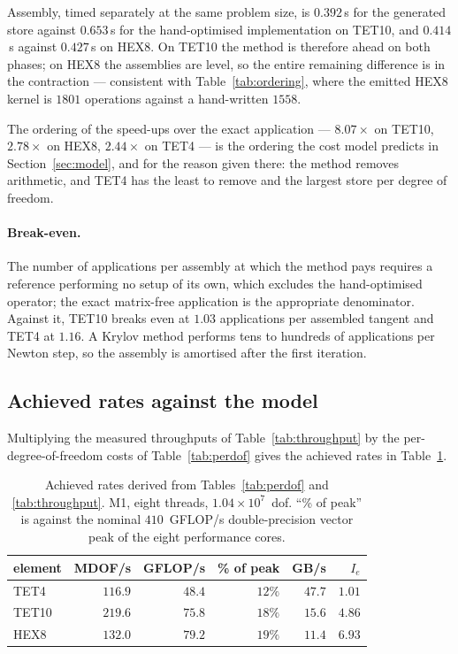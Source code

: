 \documentclass[11pt]{article}
\begin{document}
Assembly, timed separately at the same problem size, is $0.392$\,s for the
generated store against $0.653$\,s for the hand-optimised implementation on
TET10, and $0.414$\,s against $0.427$\,s on HEX8.  On TET10 the method is
therefore ahead on both phases; on HEX8 the assemblies are level, so the entire
remaining difference is in the contraction --- consistent with
Table~\ref{tab:ordering}, where the emitted HEX8 kernel is $1801$ operations
against a hand-written $1558$.

The ordering of the speed-ups over the exact application --- $8.07\times$ on
TET10, $2.78\times$ on HEX8, $2.44\times$ on TET4 --- is the ordering the cost
model predicts in Section~\ref{sec:model}, and for the reason given there: the
method removes arithmetic, and TET4 has the least to remove and the largest
store per degree of freedom.

\paragraph{Break-even.}  The number of applications per assembly at which the
method pays requires a reference performing no setup of its own, which excludes
the hand-optimised operator; the exact matrix-free application is the
appropriate denominator.  Against it, TET10 breaks even at $1.03$ applications
per assembled tangent and TET4 at $1.16$.  A Krylov method performs tens to
hundreds of applications per Newton step, so the assembly is amortised after the
first iteration.

\subsection{Achieved rates against the model}

Multiplying the measured throughputs of Table~\ref{tab:throughput} by the
per-degree-of-freedom costs of Table~\ref{tab:perdof} gives the achieved rates
in Table~\ref{tab:achieved}.

\begin{table}[ht]
\centering
\begin{tabular}{lrrrrr}
\toprule
element & MDOF/s & GFLOP/s & \% of peak & GB/s & $I_e$ \\
\midrule
TET4  & $116.9$ & $48.4$ & $12\%$ & $47.7$ & $1.01$ \\
TET10 & $219.6$ & $75.8$ & $18\%$ & $15.6$ & $4.86$ \\
HEX8  & $132.0$ & $79.2$ & $19\%$ & $11.4$ & $6.93$ \\
\bottomrule
\end{tabular}
\caption{Achieved rates derived from Tables~\ref{tab:perdof} and
\ref{tab:throughput}.  M1, eight threads, $1.04\times10^{7}$~dof.  ``\% of
peak'' is against the nominal $410$~GFLOP/s double-precision vector peak of the
eight performance cores.}
\label{tab:achieved}
\end{table}
\end{document}
